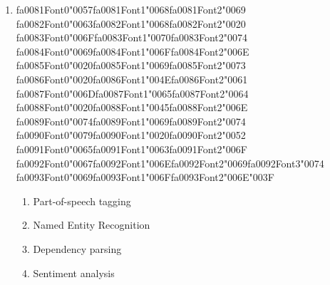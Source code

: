 \documentclass[12pt]{article}
\begin{document}
\begin{enumerate}[label=Q\arabic*.]
\begin{enumerate}[label=(\Alph*)]
    \item It cannot tokenize English at all
    \item It ignores punctuation entirely
\end{enumerate}
\item {\csname fa0081Font0\endcsname\char"0057}{\csname fa0081Font1\endcsname\char"0068}{\csname fa0081Font2\endcsname\char"0069} {\csname fa0082Font0\endcsname\char"0063}{\csname fa0082Font1\endcsname\char"0068}{\csname fa0082Font2\endcsname\char"0020} {\csname fa0083Font0\endcsname\char"006F}{\csname fa0083Font1\endcsname\char"0070}{\csname fa0083Font2\endcsname\char"0074} {\csname fa0084Font0\endcsname\char"0069}{\csname fa0084Font1\endcsname\char"006F}{\csname fa0084Font2\endcsname\char"006E} {\csname fa0085Font0\endcsname\char"0020}{\csname fa0085Font1\endcsname\char"0069}{\csname fa0085Font2\endcsname\char"0073} {\csname fa0086Font0\endcsname\char"0020}{\csname fa0086Font1\endcsname\char"004E}{\csname fa0086Font2\endcsname\char"0061} {\csname fa0087Font0\endcsname\char"006D}{\csname fa0087Font1\endcsname\char"0065}{\csname fa0087Font2\endcsname\char"0064} {\csname fa0088Font0\endcsname\char"0020}{\csname fa0088Font1\endcsname\char"0045}{\csname fa0088Font2\endcsname\char"006E} {\csname fa0089Font0\endcsname\char"0074}{\csname fa0089Font1\endcsname\char"0069}{\csname fa0089Font2\endcsname\char"0074} {\csname fa0090Font0\endcsname\char"0079}{\csname fa0090Font1\endcsname\char"0020}{\csname fa0090Font2\endcsname\char"0052} {\csname fa0091Font0\endcsname\char"0065}{\csname fa0091Font1\endcsname\char"0063}{\csname fa0091Font2\endcsname\char"006F} {\csname fa0092Font0\endcsname\char"0067}{\csname fa0092Font1\endcsname\char"006E}{\csname fa0092Font2\endcsname\char"0069}{\csname fa0092Font3\endcsname\char"0074} {\csname fa0093Font0\endcsname\char"0069}{\csname fa0093Font1\endcsname\char"006F}{\csname fa0093Font2\endcsname\char"006E}{\char"003F}
\begin{enumerate}[label=(\Alph*)]
    \item Part-of-speech tagging
    \item Named Entity Recognition
    \item Dependency parsing
    \item Sentiment analysis
\end{enumerate}

\end{enumerate}
\end{document}
